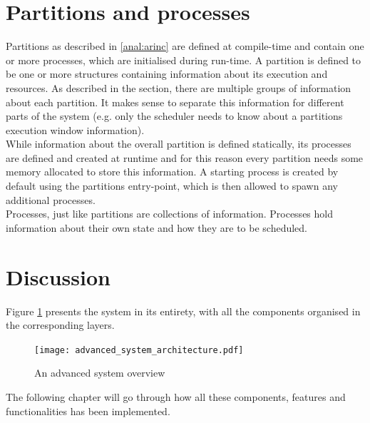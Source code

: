 \section{Partitions and processes}
\label{design:part_proc}
Partitions as described in \ref{anal:arinc} are defined at compile-time and
contain one or more processes, which are initialised during run-time.
A partition is defined to be one or more structures containing information about
its execution and resources.
As described in the  section, there are multiple
groups of information about each partition. It makes sense to separate this information for
different parts of the system (e.g. only the scheduler needs to know about a
partitions\textquotesingle{} execution window information).\\

While information about the overall partition is defined statically, its
processes are defined and created at runtime and for this reason every partition needs
some memory allocated to store this information. A starting process is created
by default using the partitions\textquotesingle{} entry-point, which is then allowed to
spawn any additional processes.\\

Processes, just like partitions are collections of information. Processes hold
information about their own state and how they are to be scheduled.

\section{Discussion}

Figure \ref{fig:advanced_system} presents the system in its entirety,
with all the components organised in the corresponding layers.

\begin{figure}[H]
\centering
\texttt{[image: advanced\_system\_architecture.pdf]}

\caption{An advanced system overview}
\label{fig:advanced_system}
\end{figure}

The following chapter will go through how all these components,
features and functionalities has been implemented.
